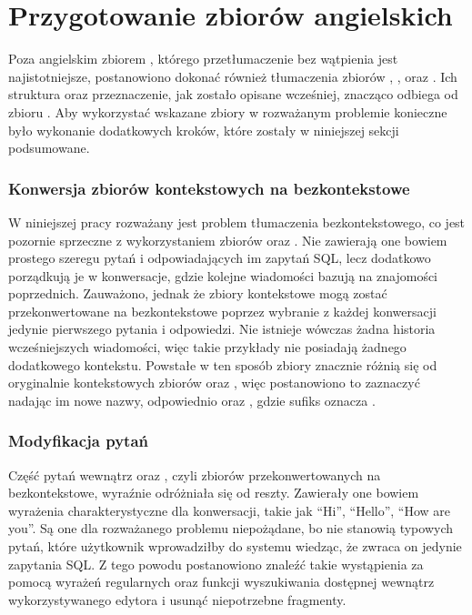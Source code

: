\section{Przygotowanie zbiorów angielskich}
Poza angielskim zbiorem , którego przetłumaczenie bez wątpienia jest najistotniejsze, postanowiono dokonać również tłumaczenia zbiorów , ,  oraz . Ich struktura oraz przeznaczenie, jak zostało opisane wcześniej, znacząco odbiega od zbioru . Aby wykorzystać wskazane zbiory w rozważanym problemie konieczne było wykonanie dodatkowych kroków, które zostały w niniejszej sekcji podsumowane.

\subsubsection{Konwersja zbiorów kontekstowych na bezkontekstowe}
W niniejszej pracy rozważany jest problem tłumaczenia bezkontekstowego, co jest pozornie sprzeczne z wykorzystaniem zbiorów  oraz . Nie zawierają one bowiem prostego szeregu pytań i odpowiadających im zapytań SQL, lecz dodatkowo porządkują je w konwersacje, gdzie kolejne wiadomości bazują na znajomości poprzednich. Zauważono, jednak że zbiory kontekstowe mogą zostać przekonwertowane na bezkontekstowe poprzez wybranie z każdej konwersacji jedynie pierwszego pytania i odpowiedzi. Nie istnieje wówczas żadna historia wcześniejszych wiadomości, więc takie przykłady nie posiadają żadnego dodatkowego kontekstu. Powstałe w ten sposób zbiory znacznie różnią się od oryginalnie kontekstowych zbiorów  oraz , więc postanowiono to zaznaczyć nadając im nowe nazwy, odpowiednio  oraz , gdzie sufiks  oznacza .

\subsubsection{Modyfikacja pytań}
Część pytań wewnątrz  oraz , czyli zbiorów przekonwertowanych na bezkontekstowe, wyraźnie odróżniała się od reszty. Zawierały one bowiem wyrażenia charakterystyczne dla konwersacji, takie jak \enquote{Hi}, \enquote{Hello}, \enquote{How are you}. Są one dla rozważanego problemu niepożądane, bo nie stanowią typowych pytań, które użytkownik wprowadziłby do systemu wiedząc, że zwraca on jedynie zapytania SQL. Z tego powodu postanowiono znaleźć takie wystąpienia za pomocą wyrażeń regularnych oraz funkcji wyszukiwania dostępnej wewnątrz wykorzystywanego edytora i usunąć niepotrzebne fragmenty.


